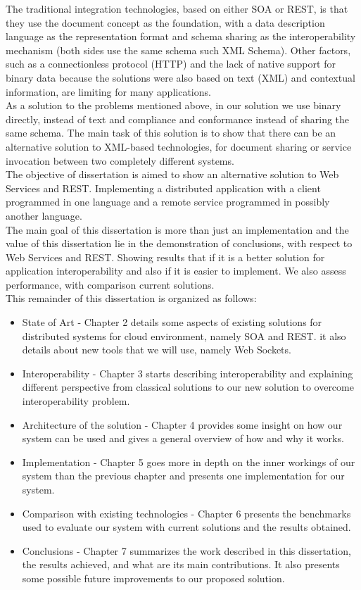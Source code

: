 The traditional integration technologies, based on either SOA or REST, is that they use the document concept as the foundation,
with a data description language as the representation format and schema sharing as the interoperability mechanism (both sides
use the same schema such XML Schema). Other factors, such as a connectionless protocol (HTTP) and the lack of native support for
binary data because the solutions were also based on text (XML) and contextual information, are limiting for many applications.\\

As a solution to the problems mentioned above, in our solution we use binary directly, instead of text and compliance and
conformance instead of sharing the same schema. The main task of this solution is to show that there can be an alternative
solution to XML-based technologies, for document sharing or service invocation between two completely different systems.\\

The objective of dissertation is aimed to show an alternative solution to Web Services and REST.
Implementing a distributed application with a client programmed in one language and a remote service programmed in possibly
another language.\\

The main goal of this dissertation is more than just an implementation and the value of this dissertation lie in the
demonstration of conclusions, with respect to Web Services and REST. Showing results that if it is a better solution for
application interoperability and also if it is easier to implement. We also assess performance, with comparison current solutions.\\

This remainder of this dissertation is organized as follows:

\begin{itemize}
\item State of Art - Chapter 2 details some aspects of existing solutions for distributed systems for cloud environment, namely SOA and REST. it also details
about new tools that we will use, namely Web Sockets. 
\item Interoperability - Chapter 3 starts describing interoperability and explaining different perspective from classical
solutions to our new solution to overcome interoperability problem.
\item Architecture of the solution - Chapter 4 provides some insight on how our system can be used and gives a general overview of
how and why it works.
\item Implementation - Chapter 5 goes more in depth on the inner workings of our system than the previous chapter and presents one implementation
for our system.
\item Comparison with existing technologies - Chapter 6 presents the benchmarks used to evaluate our system with current solutions and
the results obtained.
\item Conclusions - Chapter 7 summarizes the work described in this dissertation, the results achieved, and what are its main contributions.
It also presents some possible future improvements to our proposed solution.
\end{itemize}
